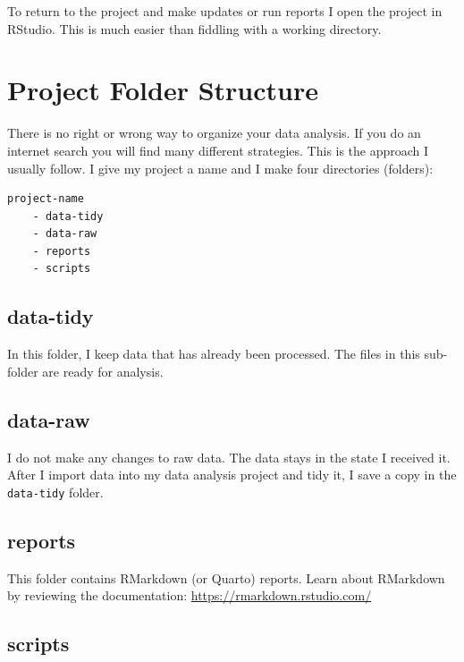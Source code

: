 \documentclass[
  letterpaper,
  DIV=11,
  numbers=noendperiod]{scrreprt}
\begin{document}
To return to the project and make updates or run reports I open the
project in RStudio. This is much easier than fiddling with a working
directory.

\hypertarget{project-folder-structure}{%
\section{Project Folder Structure}\label{project-folder-structure}}

There is no right or wrong way to organize your data analysis. If you do
an internet search you will find many different strategies. This is the
approach I usually follow. I give my project a name and I make four
directories (folders):

\begin{verbatim}
project-name
    - data-tidy
    - data-raw
    - reports
    - scripts
\end{verbatim}

\hypertarget{data-tidy}{%
\subsection{data-tidy}\label{data-tidy}}

In this folder, I keep data that has already been processed. The files
in this sub-folder are ready for analysis.

\hypertarget{data-raw}{%
\subsection{data-raw}\label{data-raw}}

I do not make any changes to raw data. The data stays in the state I
received it. After I import data into my data analysis project and tidy
it, I save a copy in the \texttt{data-tidy} folder.

\hypertarget{reports}{%
\subsection{reports}\label{reports}}

This folder contains RMarkdown (or Quarto) reports. Learn about
RMarkdown by reviewing the documentation:
\url{https://rmarkdown.rstudio.com/}

\hypertarget{scripts}{%
\subsection{scripts}\label{scripts}}
\end{document}
